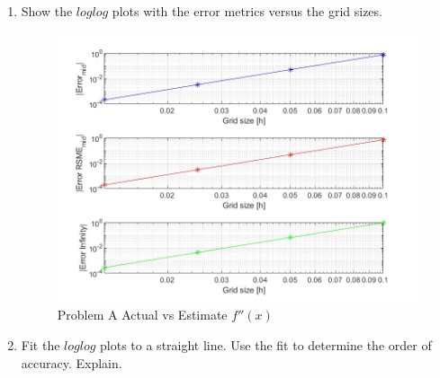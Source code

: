 \documentclass[12pt,letterpaper]{article}
\begin{document}
\begin{enumerate}
\begin{itemize}
\begin{lstlisting}[language = Matlab]
% Initialize the array approxlim
% * approxlim(1) : is the index of the first grid point where the finite
%                  difference is calculated
% * aproxlim(2) : is the index of the last grid point where the finite
%                 difference is calculated
%
% Write your code here
aproxlim = [firstendpoint,lastendpoint];





% Initialize the vector that will have the approximation
Dapprox = zeros(1, (lastendpoint-firstendpoint+1)); % +1 because Matlab indexes at 1
% You have to modify this part


% Now calculate the finite difference approximation
%
% Write your code here
x_grid_foutput = Fx(xgrid);         % returns f(x) for all x values on xgrid

length_Dapprox = length(Dapprox);
for i=1:length_Dapprox 
    Dapprox(i) = ((-1*x_grid_foutput(i))+(16*x_grid_foutput(i+1))-(30*x_grid_foutput(i+2))+(16*x_grid_foutput(i+3))+(-1*x_grid_foutput(i+4)))/(12*(h^2));
    % i = u(i-2), i+1 = u(i-1), i+2 = u(i), i+3 = u(i+1), i+4 = u(i+2)
    % Did that because Dapprox and x_grid_foutput are shifted by 2
end

end\end{lstlisting}
	\end{itemize}
\pagebreak
	\item Show the $loglog$ plots with the error metrics versus the grid sizes.
    \begin{figure}[h!]
        \centering
        \includegraphics[width=0.75\linewidth]{norm_graphs.jpg}
        \caption{Problem A\: Actual vs Estimate $f''(x)$}\label{fig:Three Norm Graphs}
      \end{figure}  
	\item Fit the $loglog$ plots to a straight line. Use the fit to determine the order of accuracy. Explain.
        

\end{enumerate}
\end{document}
